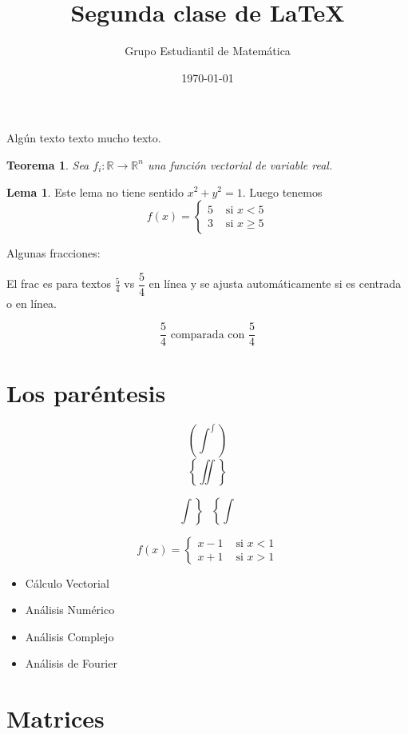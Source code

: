 \documentclass[a4paper,12pt]{article}
\title{Segunda clase de \LaTeX}
\author{Grupo Estudiantil de Matemática}
\date{\today}
\theoremstyle{theorem}
\newtheorem{teo}{Teorema}[section]
\theoremstyle{definition}
\newtheorem{lema}{Lema}[section]
\begin{document}
	\maketitle
	Algún texto texto mucho texto.
	\begin{teo}
		Sea \( f_i \colon \mathbb{R} \to \mathbb{R}^n \) una función vectorial de variable real.
	\end{teo}
	\begin{lema} 
		Este lema no tiene sentido \( x^2+y^2=1 \). Luego tenemos 
		\[ f(x)=\begin{cases} 5 & \mbox{ si } x<5 \\ 3 & \mbox{ si } x\ge5  \end{cases} \]
	\end{lema}
	
	Algunas fracciones: 
	
	El frac es para textos \( \frac{5}{4} \) vs \( \dfrac{5}{4} \) en línea y se ajusta automáticamente si es centrada o en línea.
	
	\[ \frac{5}{4} \mbox{ comparada con } \dfrac{5}{4}  \]

	\section{Los paréntesis}
	
	\[   \left(  \int^\int  \right)  \]
	  \[ \left\lbrace \iint \right\rbrace \] 
	  
	 \[ \left. \int \right\rbrace ~~~ \left\lbrace \int \right. \]
	 
	 
	\[  f(x)= \begin{cases}
		 	x-1 & \mbox{ si } x<1 \\
		 	x+1 & \mbox{ si } x>1 
	       \end{cases} \]
	       
	       
	       \begin{itemize}
	       	\item Cálculo Vectorial %
	       	\item Análisis Numérico
	       	\item Análisis Complejo
	       	\item Análisis de Fourier
	       \end{itemize}
	       
\section{Matrices}
\end{document}
